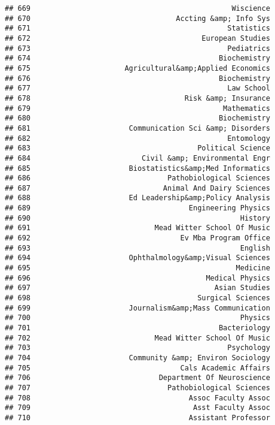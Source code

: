 \documentclass[
]{article}
\begin{document}
\begin{verbatim}
## 669                                               Wiscience
## 670                                  Accting &amp; Info Sys
## 671                                              Statistics
## 672                                        European Studies
## 673                                              Pediatrics
## 674                                            Biochemistry
## 675                      Agricultural&amp;Applied Economics
## 676                                            Biochemistry
## 677                                              Law School
## 678                                    Risk &amp; Insurance
## 679                                             Mathematics
## 680                                            Biochemistry
## 681                       Communication Sci &amp; Disorders
## 682                                              Entomology
## 683                                       Political Science
## 684                          Civil &amp; Environmental Engr
## 685                       Biostatistics&amp;Med Informatics
## 686                                Pathobiological Sciences
## 687                               Animal And Dairy Sciences
## 688                       Ed Leadership&amp;Policy Analysis
## 689                                     Engineering Physics
## 690                                                 History
## 691                             Mead Witter School Of Music
## 692                                   Ev Mba Program Office
## 693                                                 English
## 694                       Ophthalmology&amp;Visual Sciences
## 695                                                Medicine
## 696                                         Medical Physics
## 697                                           Asian Studies
## 698                                       Surgical Sciences
## 699                       Journalism&amp;Mass Communication
## 700                                                 Physics
## 701                                            Bacteriology
## 702                             Mead Witter School Of Music
## 703                                              Psychology
## 704                       Community &amp; Environ Sociology
## 705                                   Cals Academic Affairs
## 706                              Department Of Neuroscience
## 707                                Pathobiological Sciences
## 708                                     Assoc Faculty Assoc
## 709                                      Asst Faculty Assoc
## 710                                     Assistant Professor

\end{verbatim}
\end{document}
